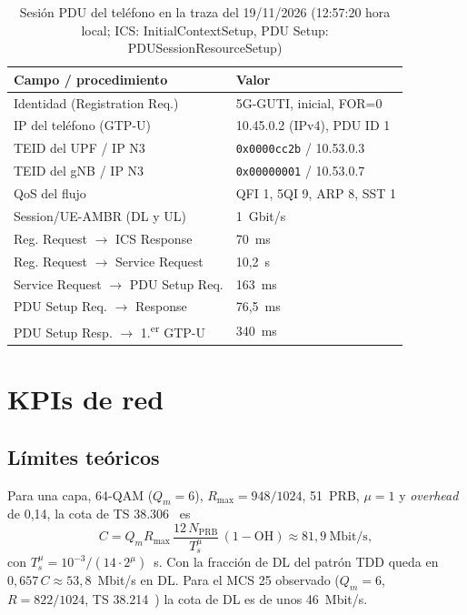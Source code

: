 \documentclass[conference]{IEEEtran}
\begin{document}
\begin{table}[!t]
\caption{Sesión PDU del teléfono en la traza del 19/11/2026 (12:57:20 hora local; ICS: InitialContextSetup, PDU Setup: PDUSessionResourceSetup)}
\label{tab:sesionpdu}
\centering
\footnotesize
\begin{tabular}{ll}
\toprule
\textbf{Campo / procedimiento} & \textbf{Valor} \\
\midrule
Identidad (Registration Req.) & 5G-GUTI, inicial, FOR=0 \\
IP del teléfono (GTP-U) & 10.45.0.2 (IPv4), PDU ID 1 \\
TEID del UPF / IP N3 & \texttt{0x0000cc2b} / 10.53.0.3 \\
TEID del gNB / IP N3 & \texttt{0x00000001} / 10.53.0.7 \\
QoS del flujo & QFI 1, 5QI 9, ARP 8, SST 1 \\
Session/UE-AMBR (DL y UL) & 1~Gbit/s \\
\midrule
Reg. Request $\rightarrow$ ICS Response & 70~ms \\
Reg. Request $\rightarrow$ Service Request & 10,2~s \\
Service Request $\rightarrow$ PDU Setup Req. & 163~ms \\
PDU Setup Req. $\rightarrow$ Response & 76,5~ms \\
PDU Setup Resp. $\rightarrow$ 1.\textsuperscript{er} GTP-U & 340~ms \\
\bottomrule
\end{tabular}
\end{table}

\section{KPIs de red}
\label{sec:kpi}

\subsection{Límites teóricos}
Para una capa, 64-QAM ($Q_m=6$), $R_{\max}=948/1024$, 51~PRB, $\mu=1$ y \textit{overhead} de 0{,}14, la cota de TS 38.306~\cite{ts38306} es
\begin{equation}
C = Q_m R_{\max}\,\frac{12\,N_\text{PRB}}{T_s^\mu}\,(1-\text{OH}) \approx 81{,}9~\text{Mbit/s},
\end{equation}
con $T_s^\mu = 10^{-3}/(14\cdot 2^\mu)$~s. Con la fracción de DL del patrón TDD queda en $0{,}657\,C \approx 53{,}8$~Mbit/s en DL. Para el MCS 25 observado ($Q_m=6$, $R=822/1024$, TS 38.214~\cite{ts38214}) la cota de DL es de unos 46~Mbit/s.
\end{document}
